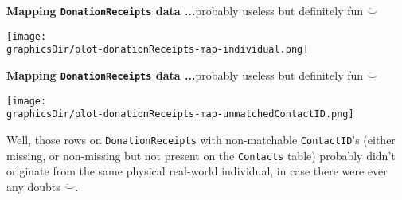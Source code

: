 \begin{frame}{{\bf Mapping \texttt{DonationReceipts} data ...}\;\tiny probably useless but definitely fun $\ddot\smile$}
\tiny

\vskip 0.4cm
\begin{center}
\texttt{[image: \\graphicsDir/plot-donationReceipts-map-individual.png]}
\end{center}

\end{frame}

\begin{frame}{{\bf Mapping \texttt{DonationReceipts} data ...}\;\tiny probably useless but definitely fun $\ddot\smile$}
\tiny

\vskip 0.4cm
\begin{center}
\texttt{[image: \\graphicsDir/plot-donationReceipts-map-unmatchedContactID.png]}
\end{center}

\begin{flushleft}
Well, those rows on \texttt{DonationReceipts} with non-matchable \texttt{ContactID}'s
(either missing, or non-missing but not present on the \texttt{Contacts} table) probably didn't originate
from the same physical real-world individual, in case there were ever any doubts $\ddot\smile$.
\end{flushleft}

\end{frame}


